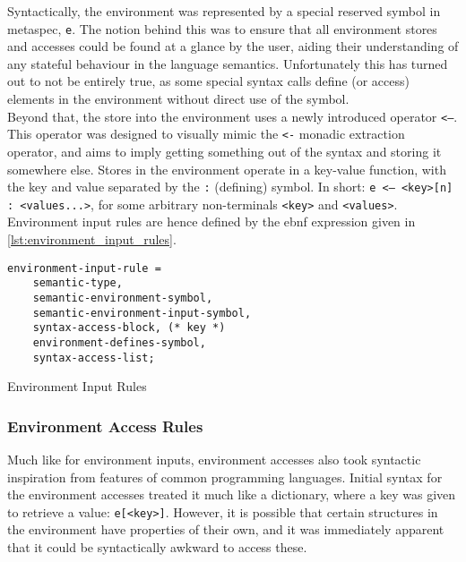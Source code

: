 Syntactically, the environment was represented by a special reserved symbol in \gls{metaspec}, \texttt{e}. 
The notion behind this was to ensure that all environment stores and accesses could be found at a glance by the user, aiding their understanding of any stateful behaviour in the language semantics. 
Unfortunately this has turned out to not be entirely true, as some special syntax calls define (or access) elements in the environment without direct use of the symbol.\\

Beyond that, the store into the environment uses a newly introduced operator \texttt{<--}. 
This operator was designed to visually mimic the \texttt{<-} monadic extraction operator, and aims to imply getting something out of the syntax and storing it somewhere else. 
Stores in the environment operate in a key-value function, with the key and value separated by the \texttt{:} (defining) symbol.
In short: \texttt{e <-- <key>[n] : <values...>}, for some arbitrary non-terminals \texttt{<key>} and \texttt{<values>}.
Environment input rules are hence defined by the \gls{ebnf} expression given in \autoref{lst:environment_input_rules}.

\begin{listing}[!htb]
\begin{verbatim}
environment-input-rule =
    semantic-type, 
    semantic-environment-symbol,
    semantic-environment-input-symbol,
    syntax-access-block, (* key *)
    environment-defines-symbol,
    syntax-access-list;
\end{verbatim}
\caption{Environment Input Rules}
\label{lst:environment_input_rules}
\end{listing}


\subsubsection{Environment Access Rules} %
\label{ssub:environment_access_rules}
Much like for environment inputs, environment accesses also took syntactic inspiration from features of common programming languages. 
Initial syntax for the environment accesses treated it much like a dictionary, where a key was given to retrieve a value: \texttt{e[<key>]}.
However, it is possible that certain structures in the environment have properties of their own, and it was immediately apparent that it could be syntactically awkward to access these.\\

